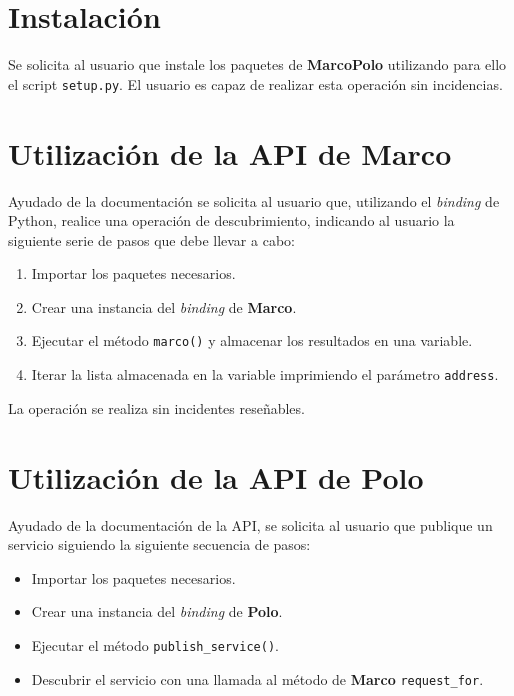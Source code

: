 \section{Instalación}

Se solicita al usuario que instale los paquetes de \textbf{MarcoPolo} utilizando para ello el script \texttt{setup.py}. El usuario es capaz de realizar esta operación sin incidencias.

\section{Utilización de la API de Marco}

Ayudado de la documentación se solicita al usuario que, utilizando el \textit{binding} de Python, realice una operación de descubrimiento, indicando al usuario la siguiente serie de pasos que debe llevar a cabo:

\begin{enumerate}

\item Importar los paquetes necesarios.
\item Crear una instancia del \textit{binding} de \textbf{Marco}.
\item Ejecutar el método \texttt{marco()} y almacenar los resultados en una variable.
\item Iterar la lista almacenada en la variable imprimiendo el parámetro \texttt{address}.

\end{enumerate}

La operación se realiza sin incidentes reseñables.

\section{Utilización de la API de Polo}

Ayudado de la documentación de la API, se solicita al usuario que publique un servicio siguiendo la siguiente secuencia de pasos:

\begin{itemize}
\item Importar los paquetes necesarios.
\item Crear una instancia del \textit{binding} de \textbf{Polo}.
\item Ejecutar el método \texttt{publish\_service()}.
\item Descubrir el servicio con una llamada al método de \textbf{Marco} \texttt{request\_for}.
\end{itemize}

